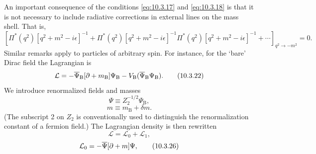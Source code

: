 An important consequence of the conditions \eqref{eq:10.3.17} and
\eqref{eq:10.3.18} is that it is not necessary to include radiative
corrections in external lines on the mass shell. That is,
\begin{equation}
\left[
\Pi^*(q^2)[q^2+m^2-i\epsilon]^{-1}
+\Pi^*(q^2)[q^2+m^2-i\epsilon]^{-1}\Pi^*(q^2)
[q^2+m^2-i\epsilon]^{-1}+\cdots
\right]_{q^2\to-m^2}=0.
\tag{10.3.21}\label{eq:10.3.21}
\end{equation}
Similar remarks apply to particles of arbitrary spin. For instance, for the
`bare' Dirac field the Lagrangian is
\begin{equation}
\mathcal L=-\overline\Psi_{\mathrm B}[\sl{\partial}+m_{\mathrm B}]\Psi_{\mathrm B}
-V_{\mathrm B}(\overline\Psi_{\mathrm B}\Psi_{\mathrm B}).
\tag{10.3.22}\label{eq:10.3.22}
\end{equation}
We introduce renormalized fields and masses
\begin{equation}
\Psi\equiv Z_2^{-1/2}\Psi_{\mathrm B},
\tag{10.3.23}\label{eq:10.3.23}
\end{equation}
\begin{equation}
m\equiv m_{\mathrm B}+\delta m.
\tag{10.3.24}\label{eq:10.3.24}
\end{equation}
(The subscript 2 on $Z_2$ is conventionally used to distinguish the
renormalization constant of a fermion field.) The Lagrangian density is then
rewritten
\begin{equation}
\mathcal L=\mathcal L_0+\mathcal L_1,
\tag{10.3.25}\label{eq:10.3.25}
\end{equation}
\begin{equation}
\mathcal L_0=-\overline\Psi[\sl{\partial}+m]\Psi,
\tag{10.3.26}\label{eq:10.3.26}
\end{equation}
